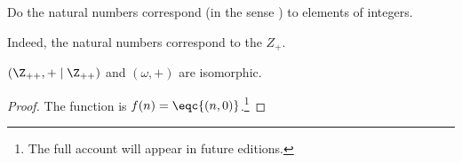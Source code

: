 

Do the natural numbers correspond (in the sense ) to elements of integers.


Indeed, the natural numbers correspond to the $Z_+$.

\begin{proposition}
  $(\Z_{++}, + \mid \Z_{++})$ and $(\omega, +)$ are isomorphic.
\end{proposition}
\begin{proof}
  The function is $f(n) = \eqc{(n, 0)}$.\footnote{The full account will appear in future editions.}
\end{proof}

\blankpage
